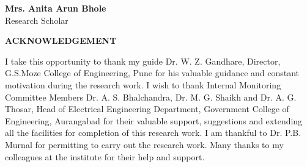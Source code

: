 \hspace{2.2in}
\begin{minipage}{4in}
\vspace{0.5in}
\begin{center}
\textbf{Mrs. Anita Arun Bhole}\\
Research Scholar
\end{center}

\end{minipage}
\clearpage
%
%
%
%


\begin{center}
\large \textbf{ACKNOWLEDGEMENT}
\end{center}

\setlength{\parskip}{1em}
\justify \normalsize I take this opportunity to thank my guide Dr. W. Z. Gandhare, Director, G.S.Moze College of Engineering, Pune for his valuable guidance and constant motivation during the research work. I wish to thank Internal Monitoring Committee Members Dr. A. S. Bhalchandra, Dr. M. G. Shaikh and Dr. A. G. Thosar, Head of Electrical Engineering Department, Government College of Engineering, Aurangabad for their valuable support, suggestions and extending all the facilities for completion of this research work. I am thankful to Dr. P.B. Murnal for permitting to carry out the research work. Many thanks to my colleagues at the institute for their help and support.

